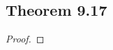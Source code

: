 \documentclass[../../main.tex]{subfiles}
\begin{document}
\subsection{Theorem 9.17}
\begin{wts}

\end{wts}
\begin{proof}

\end{proof}
\end{document}
